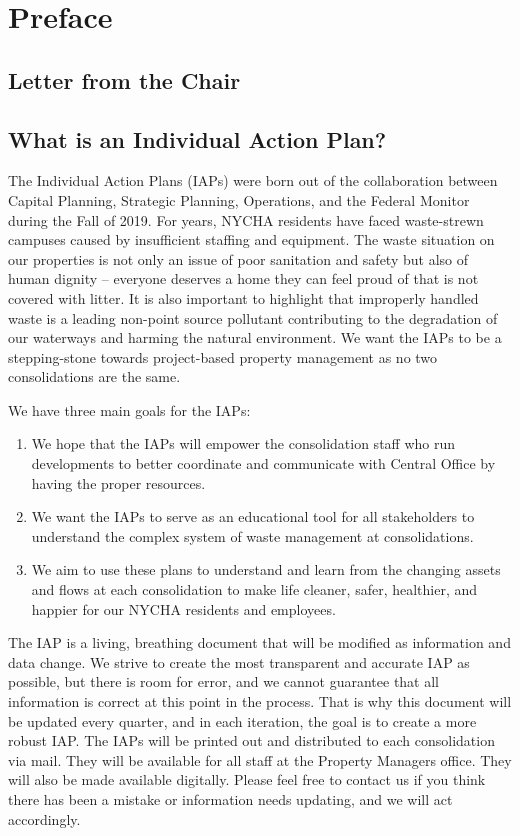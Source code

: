 \chapter{Preface}

    \section{Letter from the Chair}\label{sec:Section1}
    \clearpage
    {\selectfont
    \section{What is an Individual Action Plan?}

    The Individual Action Plans (IAPs) were born out of the collaboration between Capital Planning, Strategic Planning, Operations, and the Federal Monitor during the Fall of 2019. For years, NYCHA residents have faced waste-strewn campuses caused by insufficient staffing and equipment. The waste situation on our properties is not only an issue of poor sanitation and safety but also of human dignity -- everyone deserves a home they can feel proud of that is not covered with litter. It is also important to highlight that improperly handled waste is a leading non-point source pollutant contributing to the degradation of our waterways and harming the natural environment. We want the IAPs to be a stepping-stone towards project-based property management as no two consolidations are the same. 

    We have three main goals for the IAPs: 
    \begin{enumerate}
    \item We hope that the IAPs will empower the consolidation staff who run developments to better coordinate and communicate with Central Office by having the proper resources. 
    \item We want the IAPs to serve as an educational tool for all stakeholders to understand the complex system of waste management at consolidations. 
    \item We aim to use these plans to understand and learn from the changing assets and flows at each consolidation to make life cleaner, safer, healthier, and happier for our NYCHA residents and employees. 
    \end{enumerate}

    The IAP is a living, breathing document that will be modified as information and data change. We strive to create the most transparent and accurate IAP as possible, but there is room for error, and we cannot guarantee that all information is correct at this point in the process. That is why this document will be updated every quarter, and in each iteration, the goal is to create a more robust IAP. The IAPs will be printed out and distributed to each consolidation via mail. They will be available for all staff at the Property Managers office. They will also be made available digitally. Please feel free to contact us if you think there has been a mistake or information needs updating, and we will act accordingly. 


}
